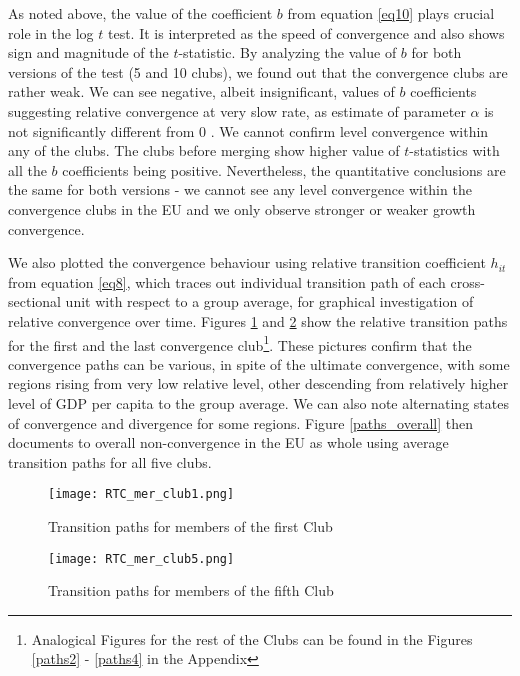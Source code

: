\documentclass[11pt]{article}
\begin{document}
As noted above, the value of the coefficient $b$ from equation \ref{eq10} plays crucial role in the log $t$ test. It is interpreted as the speed of convergence and also shows sign and magnitude of the $t$-statistic. By analyzing the value of $b$ for both versions of the test (5 and 10 clubs), we found out that the convergence clubs are rather weak. We can see negative, albeit insignificant, values of $b$ coefficients suggesting relative convergence at very slow rate, as estimate of parameter $\alpha$ is not significantly different from 0 \citep{phillips2007transition}. We cannot confirm level convergence within any of the clubs. 
The clubs before merging show higher value of $t$-statistics with all the $b$ coefficients being positive. Nevertheless, the quantitative conclusions are the same for both versions - we cannot see any level convergence within the convergence clubs in the EU and we only observe stronger or weaker growth convergence.

We also plotted the convergence behaviour using relative transition coefficient $h_{it}$ from equation \ref{eq8}, which traces out individual transition path of each cross-sectional unit with respect to a group average, for graphical investigation of relative convergence over time. Figures \ref{paths1} and \ref{paths5} show the relative transition paths for the first and the last convergence club\footnote{Analogical Figures for the rest of the Clubs can be found in the Figures \ref{paths2} - \ref{paths4} in the Appendix}. These pictures confirm that the convergence paths can be various, in spite of the ultimate convergence, with some regions rising from very low relative level, other descending from relatively higher level of GDP per capita to the group average. We can also note alternating states of convergence and divergence for some regions. Figure \ref{paths_overall} then documents to overall non-convergence in the EU as whole using average transition paths for all five clubs.

\begin{figure}%
    \centering
    \texttt{[image: RTC\_mer\_club1.png]}
    \caption{Transition paths for members of the first Club}
    \label{paths1}
\end{figure}

\begin{figure}%
    \centering
    \texttt{[image: RTC\_mer\_club5.png]}
    \caption{Transition paths for members of the fifth Club }
    \label{paths5}
\end{figure}
\end{document}
